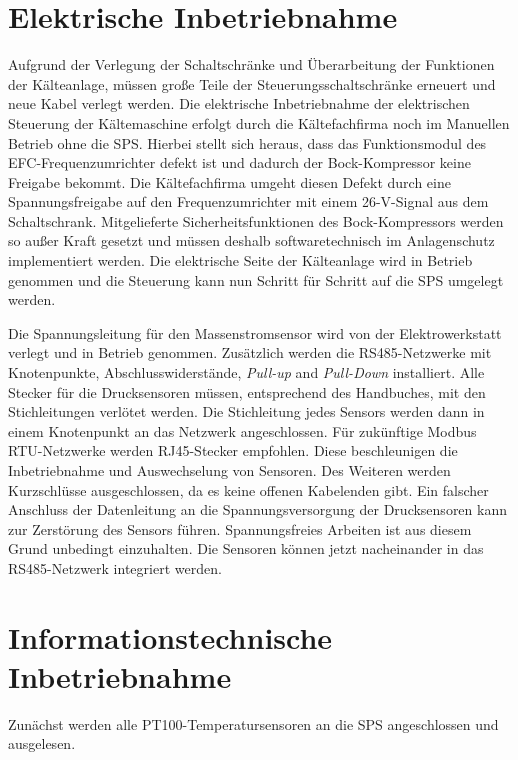 \section{Elektrische Inbetriebnahme}
\label{Inbetriebnahme_ACDC}

Aufgrund der Verlegung der Schaltschränke und Überarbeitung der Funktionen der Kälteanlage, müssen große Teile der Steuerungsschaltschränke erneuert und neue Kabel verlegt werden. Die elektrische Inbetriebnahme der elektrischen Steuerung der Kältemaschine erfolgt durch die Kältefachfirma noch im Manuellen Betrieb ohne die SPS. Hierbei stellt sich heraus, dass das Funktionsmodul des EFC-Frequenzumrichter defekt ist und dadurch der Bock-Kompressor keine Freigabe bekommt. Die Kältefachfirma umgeht diesen Defekt durch eine Spannungsfreigabe auf den Frequenzumrichter mit einem 26-V-Signal aus dem Schaltschrank. Mitgelieferte Sicherheitsfunktionen des Bock-Kompressors werden so außer Kraft gesetzt und müssen deshalb softwaretechnisch im Anlagenschutz implementiert werden. 
Die elektrische Seite der Kälteanlage wird in Betrieb genommen und die Steuerung kann nun Schritt für Schritt auf die SPS umgelegt werden.

Die Spannungsleitung für den Massenstromsensor wird von der Elektrowerkstatt verlegt und in Betrieb genommen. Zusätzlich werden die RS485-Netzwerke mit Knotenpunkte, Abschlusswiderstände, \textit{Pull-up} and \textit{Pull-Down} installiert. Alle Stecker für die Drucksensoren müssen, entsprechend des Handbuches, mit den Stichleitungen verlötet werden. Die Stichleitung jedes Sensors werden dann in einem Knotenpunkt an das Netzwerk angeschlossen. Für zukünftige Modbus RTU-Netzwerke werden RJ45-Stecker empfohlen. Diese beschleunigen die Inbetriebnahme und Auswechselung von Sensoren. Des Weiteren werden Kurzschlüsse ausgeschlossen, da es keine offenen Kabelenden gibt. Ein falscher Anschluss der Datenleitung an die Spannungsversorgung der Drucksensoren kann zur Zerstörung des Sensors führen. Spannungsfreies Arbeiten ist aus diesem Grund unbedingt einzuhalten. 
Die Sensoren können jetzt nacheinander in das RS485-Netzwerk integriert werden. 

\section{Informationstechnische Inbetriebnahme}
\label{sec:Inbetriebnahme_IT}

Zunächst werden alle PT100-Temperatursensoren an die SPS angeschlossen und ausgelesen. 

